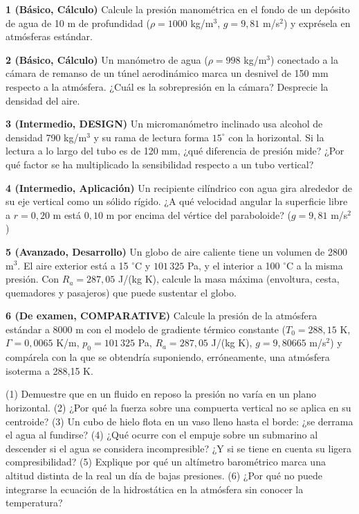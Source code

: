 \documentclass[10pt,openany]{book}
\begin{document}
\begin{tcolorbox}[title={Ejercicios propuestos}, studiumworked, breakable]

\noindent\textbf{1 (Básico, Cálculo)}
Calcule la presión manométrica en el fondo de un depósito de agua de 10 m de profundidad (\(\rho = 1000\) kg/m\(^3\), \(g = 9{,}81\) m/s\(^2\)) y exprésela en atmósferas estándar.

\noindent\textbf{2 (Básico, Cálculo)}
Un manómetro de agua (\(\rho = 998\) kg/m\(^3\)) conectado a la cámara de remanso de un túnel aerodinámico marca un desnivel de 150 mm respecto a la atmósfera. ¿Cuál es la sobrepresión en la cámara? Desprecie la densidad del aire.

\noindent\textbf{3 (Intermedio, DESIGN)}
Un micromanómetro inclinado usa alcohol de densidad 790 kg/m\(^3\) y su rama de lectura forma \(15^\circ\) con la horizontal. Si la lectura a lo largo del tubo es de 120 mm, ¿qué diferencia de presión mide? ¿Por qué factor se ha multiplicado la sensibilidad respecto a un tubo vertical?

\noindent\textbf{4 (Intermedio, Aplicación)}
Un recipiente cilíndrico con agua gira alrededor de su eje vertical como un sólido rígido. ¿A qué velocidad angular la superficie libre a \(r = 0{,}20\) m está \(0{,}10\) m por encima del vértice del paraboloide? (\(g = 9{,}81\) m/s\(^2\))

\noindent\textbf{5 (Avanzado, Desarrollo)}
Un globo de aire caliente tiene un volumen de 2800 m\(^3\). El aire exterior está a 15 \(^\circ\)C y \(101\,325\) Pa, y el interior a 100 \(^\circ\)C a la misma presión. Con \(R_a = 287{,}05\) J/(kg K), calcule la masa máxima (envoltura, cesta, quemadores y pasajeros) que puede sustentar el globo.

\noindent\textbf{6 (De examen, COMPARATIVE)}
Calcule la presión de la atmósfera estándar a 8000 m con el modelo de gradiente térmico constante (\(T_0 = 288{,}15\) K, \(\Gamma = 0{,}0065\) K/m, \(p_0 = 101\,325\) Pa, \(R_a = 287{,}05\) J/(kg K), \(g = 9{,}80665\) m/s\(^2\)) y compárela con la que se obtendría suponiendo, erróneamente, una atmósfera isoterma a 288,15 K.
\end{tcolorbox}

\begin{tcolorbox}[title={Autoevaluación}, studiumcheck, breakable]

(1) Demuestre que en un fluido en reposo la presión no varía en un plano horizontal. (2) ¿Por qué la fuerza sobre una compuerta vertical no se aplica en su centroide? (3) Un cubo de hielo flota en un vaso lleno hasta el borde: ¿se derrama el agua al fundirse? (4) ¿Qué ocurre con el empuje sobre un submarino al descender si el agua se considera incompresible? ¿Y si se tiene en cuenta su ligera compresibilidad? (5) Explique por qué un altímetro barométrico marca una altitud distinta de la real un día de bajas presiones. (6) ¿Por qué no puede integrarse la ecuación de la hidrostática en la atmósfera sin conocer la temperatura?
\end{tcolorbox}
\studiumchaptercheck
\end{document}
